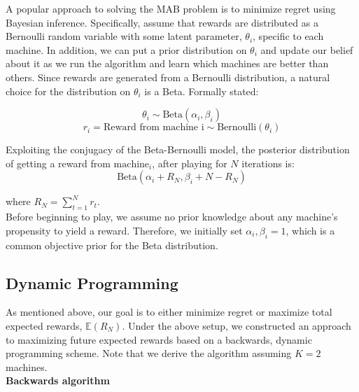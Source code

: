 \documentclass{article}
\begin{document}
A popular approach to solving the MAB problem is to minimize regret using Bayesian inference. Specifically, assume that rewards are distributed as a Bernoulli random variable with some latent parameter, $\theta_i$, specific to each machine. In addition, we can put a prior distribution on $\theta_i$ and update our belief about it as we run the algorithm and learn which machines are better than others. Since rewards are generated from a Bernoulli distribution, a natural choice for the distribution on $\theta_i$ is a Beta. Formally stated:

$$\theta_i \sim \text{Beta}(\alpha_i, \beta_i)$$
$$r_i = \text{Reward from machine i} \sim \text{Bernoulli}(\theta_i)$$

Exploiting the conjugacy of the Beta-Bernoulli model, the posterior distribution of getting a reward from $\text{machine}_i$, after playing for $N$ iterations is:
$$\text{Beta}(\alpha_i + R_{N}, \beta_i + N - R_{N})$$

where $R_{N} = \sum_{t=1}^{N}r_{t}$.\\

Before beginning to play, we assume no prior knowledge about any machine's propensity to yield a reward. Therefore, we initially set $\alpha_i, \beta_i = 1$, which is a common objective prior for the Beta distribution.\\

\subsection{Dynamic Programming}

As mentioned above, our goal is to either minimize regret or maximize total expected rewards, $\mathbb{E}(R_N)$. Under the above setup, we constructed an approach to maximizing future expected rewards based on a backwards, dynamic programming scheme. Note that we derive the algorithm assuming $K = 2$ machines.\\

\textbf{Backwards algorithm}
\end{document}

